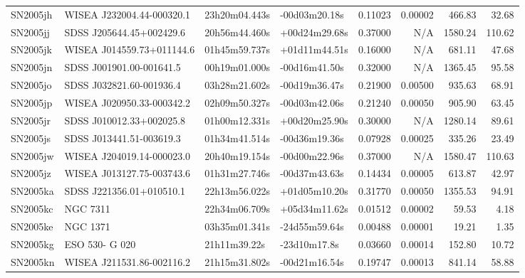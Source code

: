 \begin{longtable}{llllrrrr}
SN2005jh         &       WISEA J232004.44-000320.1 &   23h20m04.443s &   -00d03m20.18s &  0.11023 &  0.00002 &   466.83 &       32.68 \\
SN2005jj         &        SDSS J205644.45+002429.6 &   20h56m44.460s &   +00d24m29.68s &  0.37000 &      N/A &  1580.24 &      110.62 \\
SN2005jk         &       WISEA J014559.73+011144.6 &   01h45m59.737s &   +01d11m44.51s &  0.16000 &      N/A &   681.11 &       47.68 \\
SN2005jn         &        SDSS J001901.00-001641.5 &   00h19m01.000s &   -00d16m41.50s &  0.32000 &      N/A &  1365.45 &       95.58 \\
SN2005jo         &        SDSS J032821.60-001936.4 &   03h28m21.602s &   -00d19m36.47s &  0.21900 &  0.00500 &   935.63 &       68.91 \\
SN2005jp         &       WISEA J020950.33-000342.2 &   02h09m50.327s &   -00d03m42.06s &  0.21240 &  0.00050 &   905.90 &       63.45 \\
SN2005jr         &        SDSS J010012.33+002025.8 &   01h00m12.331s &   +00d20m25.90s &  0.30000 &      N/A &  1280.14 &       89.61 \\
SN2005js         &        SDSS J013441.51-003619.3 &   01h34m41.514s &   -00d36m19.36s &  0.07928 &  0.00025 &   335.26 &       23.49 \\
SN2005jw         &       WISEA J204019.14-000023.0 &   20h40m19.154s &   -00d00m22.96s &  0.37000 &      N/A &  1580.47 &      110.63 \\
SN2005jz         &       WISEA J013127.75-003743.6 &   01h31m27.746s &   -00d37m43.63s &  0.14434 &  0.00005 &   613.87 &       42.97 \\
SN2005ka         &        SDSS J221356.01+010510.1 &   22h13m56.022s &   +01d05m10.20s &  0.31770 &  0.00050 &  1355.53 &       94.91 \\
SN2005kc         &                        NGC 7311 &   22h34m06.709s &   +05d34m11.62s &  0.01512 &  0.00002 &    59.53 &        4.18 \\
SN2005ke         &                        NGC 1371 &   03h35m01.341s &   -24d55m59.64s &  0.00488 &  0.00001 &    19.21 &        1.35 \\
SN2005kg         &                  ESO 530- G 020 &    21h11m39.22s &    -23d10m17.8s &  0.03660 &  0.00014 &   152.80 &       10.72 \\
SN2005kn         &       WISEA J211531.86-002116.2 &   21h15m31.802s &   -00d21m16.54s &  0.19747 &  0.00013 &   841.14 &       58.88 \\

\end{longtable}
